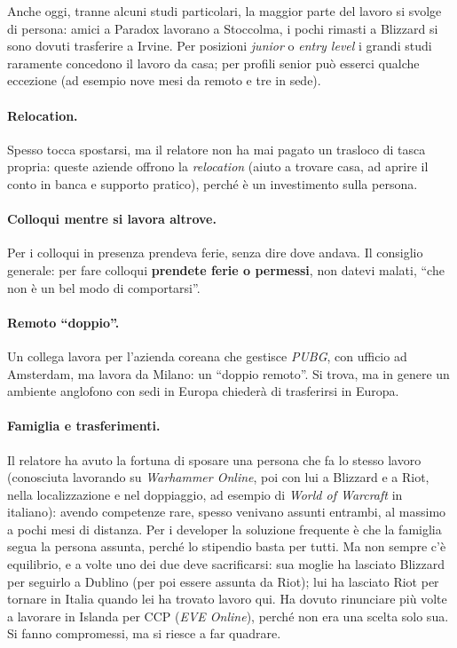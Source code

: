 Anche oggi, tranne alcuni studi particolari, la maggior parte del lavoro si
svolge di persona: amici a Paradox lavorano a Stoccolma, i pochi rimasti a
Blizzard si sono dovuti trasferire a Irvine. Per posizioni \emph{junior} o
\emph{entry level} i grandi studi raramente concedono il lavoro da casa; per
profili senior può esserci qualche eccezione (ad esempio nove mesi da remoto
e tre in sede).

\paragraph{Relocation.} Spesso tocca spostarsi, ma il relatore non ha mai
pagato un trasloco di tasca propria: queste aziende offrono la
\emph{relocation} (aiuto a trovare casa, ad aprire il conto in banca e
supporto pratico), perché è un investimento sulla persona.

\paragraph{Colloqui mentre si lavora altrove.} Per i colloqui in presenza
prendeva ferie, senza dire dove andava. Il consiglio generale: per fare
colloqui \textbf{prendete ferie o permessi}, non datevi malati, ``che non è un
bel modo di comportarsi''.

\paragraph{Remoto ``doppio''.} Un collega lavora per l'azienda coreana che
gestisce \emph{PUBG}, con ufficio ad Amsterdam, ma lavora da Milano: un
``doppio remoto''. Si trova, ma in genere un ambiente anglofono con sedi in
Europa chiederà di trasferirsi in Europa.

\paragraph{Famiglia e trasferimenti.} Il relatore ha avuto la fortuna di
sposare una persona che fa lo stesso lavoro (conosciuta lavorando su
\emph{Warhammer Online}, poi con lui a Blizzard e a Riot, nella
localizzazione e nel doppiaggio, ad esempio di \emph{World of Warcraft} in
italiano): avendo competenze rare, spesso venivano assunti entrambi, al
massimo a pochi mesi di distanza. Per i developer la soluzione frequente è
che la famiglia segua la persona assunta, perché lo stipendio basta per
tutti. Ma non sempre c'è equilibrio, e a volte uno dei due deve sacrificarsi:
sua moglie ha lasciato Blizzard per seguirlo a Dublino (per poi essere
assunta da Riot); lui ha lasciato Riot per tornare in Italia quando lei ha
trovato lavoro qui. Ha dovuto rinunciare più volte a lavorare in Islanda per
CCP (\emph{EVE Online}), perché non era una scelta solo sua. Si fanno
compromessi, ma si riesce a far quadrare.

